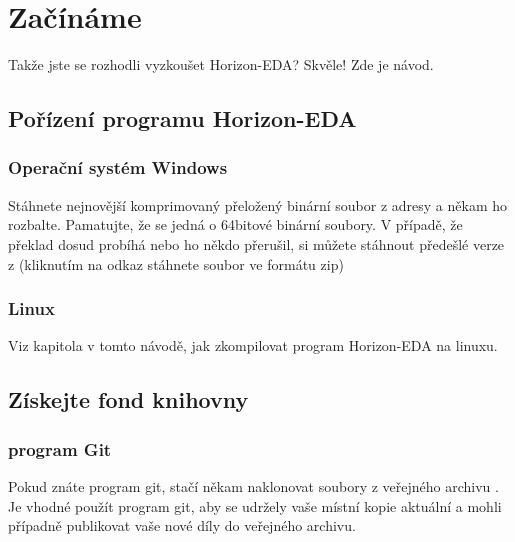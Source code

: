 \documentclass[letterpaper,10pt,czech]{sphinxmanual}
\begin{document}
\chapter{Začínáme}
\label{\detokenize{getting-started:zaciname}}\label{\detokenize{getting-started::doc}}
Takže jste se rozhodli vyzkoušet Horizon-EDA? Skvěle! Zde je návod.


\section{Pořízení programu Horizon-EDA}
\label{\detokenize{getting-started:porizeni-programu-horizon-eda}}

\subsection{Operační systém Windows}
\label{\detokenize{getting-started:operacni-system-windows}}
Stáhnete nejnovější komprimovaný přeložený binární soubor z adresy 
a někam ho rozbalte. Pamatujte, že se jedná o 64bitové binární soubory. V případě, že překlad dosud probíhá  nebo ho někdo přerušil, si můžete stáhnout předešlé verze z
(kliknutím na odkaz stáhnete soubor ve formátu zip)


\subsection{Linux}
\label{\detokenize{getting-started:linux}}
Viz kapitola
{\hyperref[\detokenize{build-linux::doc}]{}} v tomto návodě, jak zkompilovat program Horizon-EDA na linuxu.


\section{Získejte fond knihovny}
\label{\detokenize{getting-started:ziskejte-fond-knihovny}}

\subsection{program Git}
\label{\detokenize{getting-started:program-git}}
Pokud znáte program git, stačí někam naklonovat soubory z veřejného archivu
. Je vhodné použít program git, aby se udržely vaše místní
kopie aktuální a mohli případně publikovat vaše nové díly do veřejného archivu.
\end{document}
